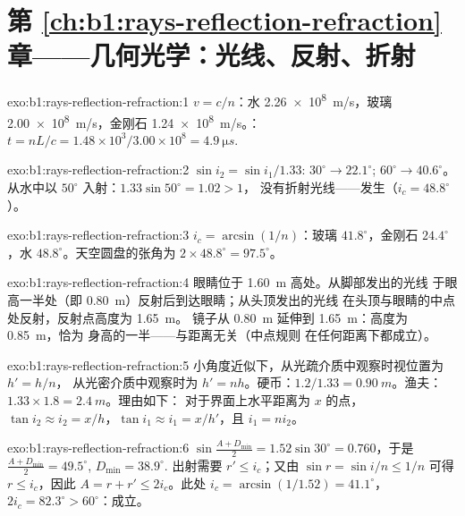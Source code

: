 \section*{第 \ref{ch:b1:rays-reflection-refraction} 章——几何光学：光线、反射、折射}

\begin{solution}{exo:b1:rays-reflection-refraction:1}
$v = c/n$：水 \qty{2.26e8}{m/s}，玻璃 \qty{2.00e8}{m/s}，金刚石
\qty{1.24e8}{m/s}。：$t = nL/c = 1.48 \times 10^3/3.00\times10^8 =
\qty{4.9}{\micro s}$.
\end{solution}

\begin{solution}{exo:b1:rays-reflection-refraction:2}
$\sin i_2 = \sin i_1/1.33$: $30^\circ \to 22.1^\circ$; $60^\circ \to
40.6^\circ$。从水中以 $50^\circ$ 入射：$1.33\sin 50^\circ = 1.02 > 1$，
没有折射光线——发生（$i_c = 48.8^\circ$）。
\end{solution}

\begin{solution}{exo:b1:rays-reflection-refraction:3}
$i_c = \arcsin(1/n)$：玻璃 $41.8^\circ$，金刚石 $24.4^\circ$，水
$48.8^\circ$。天空圆盘的张角为 $2 \times 48.8^\circ = 97.5^\circ$。
\end{solution}

\begin{solution}{exo:b1:rays-reflection-refraction:4}
眼睛位于 \qty{1.60}{m} 高处。从脚部发出的光线
于眼高一半处（即 \qty{0.80}{m}）反射后到达眼睛；从头顶发出的光线
在头顶与眼睛的中点处反射，反射点高度为 \qty{1.65}{m}。
镜子从 \qty{0.80}{m} 延伸到 \qty{1.65}{m}：高度为 \qty{0.85}{m}，恰为
身高的一半——与距离无关（中点规则
在任何距离下都成立）。
\end{solution}

\begin{solution}{exo:b1:rays-reflection-refraction:5}
小角度近似下，从光疏介质中观察时视位置为 $h' = h/n$，
从光密介质中观察时为 $h' = nh$。硬币：$1.2/1.33 =
\qty{0.90}{m}$。渔夫：$1.33 \times 1.8 = \qty{2.4}{m}$。理由如下：
对于界面上水平距离为 $x$ 的点，$\tan i_2 \approx i_2 =
x/h$，$\tan i_1 \approx i_1 = x/h'$，且 $i_1 = n i_2$。
\end{solution}

\begin{solution}{exo:b1:rays-reflection-refraction:6}
$\sin\frac{A + D_{\min}}{2} = 1.52\sin 30^\circ = 0.760$，于是
$\frac{A + D_{\min}}{2} = 49.5^\circ$, $D_{\min} = 38.9^\circ$.
出射需要 $r' \leq i_c$；又由 $\sin r = \sin i/n \leq 1/n$ 可得
$r \leq i_c$，因此 $A = r + r' \leq 2i_c$。此处 $i_c = \arcsin(1/1.52) =
41.1^\circ$，$2i_c = 82.3^\circ > 60^\circ$：成立。
\end{solution}

